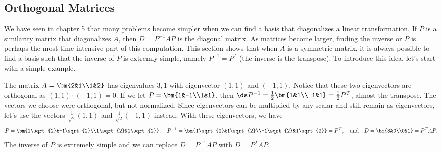 \subsection{Orthogonal Matrices}
We have seen in chapter 5 that many problems become simpler when we can find a basis that diagonalizes a linear transformation. If $P$ is a similarity matrix that diagonalizes $A$, then $D=P^{-1}AP$ is the diagonal matrix.  As matrices become larger, finding the inverse or $P$ is perhaps the most time intensive part of this computation.  This section shows that when $A$ is a symmetric matrix, it is always possible to find a basis such that the inverse of $P$ is extremly simple, namely $P^{-1} = P^T$ (the inverse is the transpose). To introduce this idea, let's start with a simple example.

\begin{example}
The matrix $A = \bm {2&1\\1&2}$ has eigenvalues $3,1$ with eigenvector $(1,1)$ and $(-1,1)$. 
Notice that these two eigenvectors are orthogonal as $(1,1)\cdot(-1,1)=0$. 
If we let $P = \bm{1&-1\\1&1}$, then $\ds P^{-1} = \frac{1}{2}\bm{1&1\\-1&1} = \frac{1}{2}P^T$, almost the transpose.
The vectors we choose were orthogonal, but not normalized. Since eigenvectors can be multiplied by any scalar and still remain as eigenvectors, let's use the vectors $\frac{1}{\sqrt{2}}(1,1)$ and $\frac{1}{\sqrt{2}}(-1,1)$ instead. With these eigenvectors, we have 
$$P = \bm{1\sqrt{2}&-1\sqrt{2}\\1\sqrt{2}&1\sqrt{2}}, \quad P^{-1} = \bm{1\sqrt{2}&1\sqrt{2}\\-1\sqrt{2}&1\sqrt{2}} = P^T,\quad
\text{and}\quad D = \bm{3&0\\0&1} = P^T A P.$$ 
The inverse of $P$ is extremely simple and we can replace $D=P^{-1}AP$ with $D=P^T A P$.  
\end{example}

